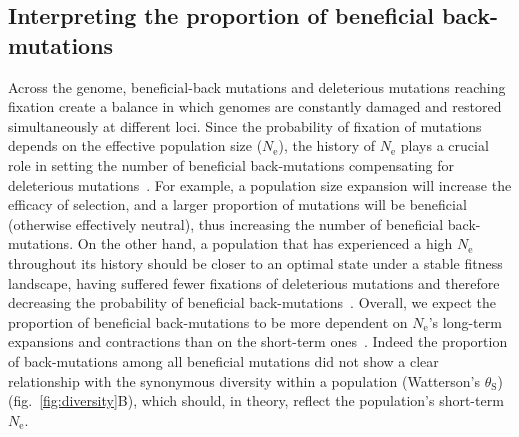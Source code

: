 \documentclass{article}
\newcommand{\Ne}{N_{\text{e}}}
\newcommand{\thetaSyn}{\theta_{\text{S}}}
\begin{document}
    \subsection*{Interpreting the proportion of beneficial back-mutations}

    Across the genome, beneficial-back mutations and deleterious mutations reaching fixation create a balance in which genomes are constantly damaged and restored simultaneously at different loci.
    Since the probability of fixation of mutations depends on the effective population size ($\Ne$), the history of $\Ne$ plays a crucial role in setting the number of beneficial back-mutations compensating for deleterious mutations~\cite{latrille_inferring_2021}.
    For example, a population size expansion will increase the efficacy of selection, and a larger proportion of mutations will be beneficial (otherwise effectively neutral), thus increasing the number of beneficial back-mutations.
    On the other hand, a population that has experienced a high $\Ne$ throughout its history should be closer to an optimal state under a stable fitness landscape, having suffered fewer fixations of deleterious mutations and therefore decreasing the probability of beneficial back-mutations~\cite{huber_determining_2017}.
    Overall, we expect the proportion of beneficial back-mutations to be more dependent on $\Ne$’s long-term expansions and contractions than on the short-term ones~\cite{charlesworth_other_2007,huber_determining_2017}.
    Indeed the proportion of back-mutations among all beneficial mutations did not show a clear relationship with the synonymous diversity within a population (Watterson's $\thetaSyn$) (fig.~\ref{fig:diversity}B), which should, in theory, reflect the population's short-term $\Ne$.

\end{document}
